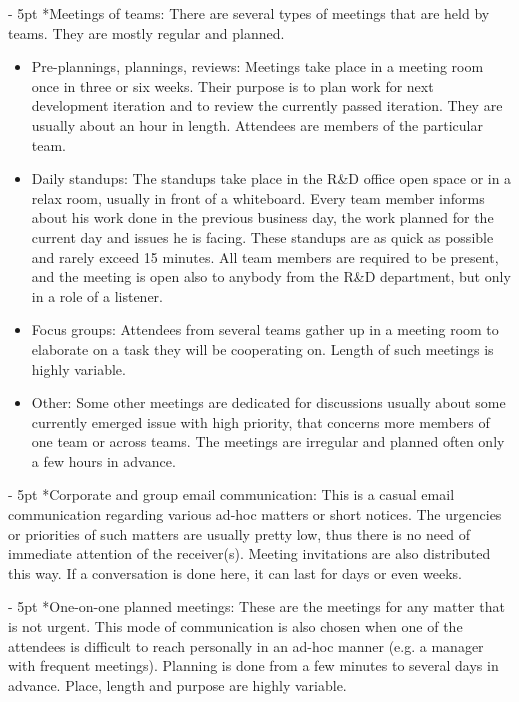 \documentclass[11pt,singleside]{myfithesis2}
\makeatletter
\renewcommand\paragraph{
   \vspace{-10pt}
   \@startsection{paragraph}{4}{0mm}
      {\baselineskip}
      {- 5pt}
      {\normalfont\normalsize\bfseries}
}
\makeatother
\begin{document}
\paragraph*{Meetings of teams: } There are several types of meetings that are held by teams. They are mostly regular and planned.
\begin{itemize}
	\item{Pre-plannings, plannings, reviews:} Meetings take place in a meeting room once in three or six weeks. Their purpose is to plan work for next development iteration and to review the currently passed iteration. They are usually about an hour in length. Attendees are members of the particular team. 
	\item{Daily standups:} The standups take place in the R\&D office open space or in a relax room, usually in front of a whiteboard. Every team member informs about his work done in the previous business day, the work planned for the current day and issues he is facing. These standups are as quick as possible and rarely exceed 15 minutes. All team members are required to be present, and the meeting is open also to anybody from the R\&D department, but only in a role of a listener.
	\item{Focus groups:} Attendees from several teams gather up in a meeting room to elaborate on a task they will be cooperating on. Length of such meetings is highly variable.
	\item{Other:} Some other meetings are dedicated for discussions usually about some currently emerged issue with high priority, that concerns more members of one team or across teams. The meetings are irregular and planned often only a few hours in advance.
\end{itemize}

\paragraph*{Corporate and group email communication: } This is a casual email communication regarding various ad-hoc matters or short notices. The urgencies or priorities of such matters are usually pretty low, thus there is no need of immediate attention of the receiver(s). Meeting invitations are also distributed this way. If a conversation is done here, it can last for days or even weeks.

\paragraph*{One-on-one planned meetings: } These are the meetings for any matter that is not urgent. This mode of communication is also chosen when one of the attendees is difficult to reach personally in an ad-hoc manner (e.g. a manager with frequent meetings). Planning is done from a few minutes to several days in advance. Place, length and purpose are highly variable.
\end{document}

